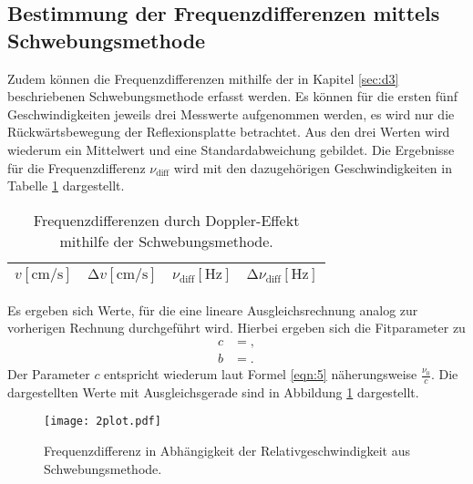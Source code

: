 \subsection{Bestimmung der Frequenzdifferenzen mittels Schwebungsmethode}
Zudem können die Frequenzdifferenzen mithilfe der in Kapitel \ref{sec:d3} beschriebenen Schwebungsmethode erfasst werden.
Es können für die ersten fünf Geschwindigkeiten jeweils drei Messwerte aufgenommen werden, es wird nur die Rückwärtsbewegung der Reflexionsplatte betrachtet.
Aus den drei Werten wird wiederum ein Mittelwert und eine Standardabweichung gebildet.
Die Ergebnisse für die Frequenzdifferenz $\nu_{\text{diff}}$ wird mit den dazugehörigen Geschwindigkeiten in Tabelle \ref{tab:diffe2} dargestellt.
\begin{table}
  \centering
  \caption{Frequenzdifferenzen durch Doppler-Effekt mithilfe der Schwebungsmethode.}
  \label{tab:diffe2}
  \begin{tabular}{c c c c}
    \toprule
    {$v [\si{\centi\metre\per\second}]$} & {$\increment{v} [\si{\centi\metre\per\second}]$} & {$\nu_{\text{diff}} [\si{\hertz}]$} & {$\increment{\nu_{\text{diff}}} [\si{\hertz}]$}\\
    \midrule
    
    \bottomrule
  \end{tabular}
\end{table}
Es ergeben sich Werte, für die eine lineare Ausgleichsrechnung analog zur vorherigen Rechnung durchgeführt wird.
Hierbei ergeben sich die Fitparameter zu
\begin{align*}
  c &= , \\
  b &= .
\end{align*}
Der Parameter $c$ entspricht wiederum laut Formel \ref{eqn:5} näherungsweise $\frac{ \nu_0}{c}$.
Die dargestellten Werte mit Ausgleichsgerade sind in Abbildung \ref{afig:2} dargestellt.
\begin{figure}
  \centering
  \texttt{[image: 2plot.pdf]}
  \caption{Frequenzdifferenz in Abhängigkeit der Relativgeschwindigkeit aus Schwebungsmethode.}
  \label{afig:2}
\end{figure}
%
%    
%
